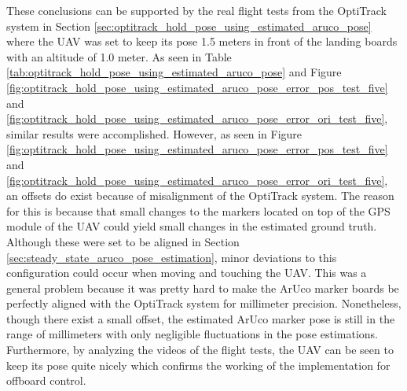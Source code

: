 \documentclass[../Head/report.tex]{subfiles}
\begin{document}
These conclusions can be supported by the real flight tests from the OptiTrack system in Section \ref{sec:optitrack_hold_pose_using_estimated_aruco_pose} where the UAV was set to keep its pose 1.5 meters in front of the landing boards with an altitude of 1.0 meter. As seen in Table \ref{tab:optitrack_hold_pose_using_estimated_aruco_pose} and Figure \ref{fig:optitrack_hold_pose_using_estimated_aruco_pose_error_pos_test_five} and \ref{fig:optitrack_hold_pose_using_estimated_aruco_pose_error_ori_test_five},  similar results were accomplished. However, as seen in Figure \ref{fig:optitrack_hold_pose_using_estimated_aruco_pose_error_pos_test_five} and \ref{fig:optitrack_hold_pose_using_estimated_aruco_pose_error_ori_test_five}, an offsets do exist because of misalignment of the OptiTrack system. The reason for this is because that small changes to the markers located on top of the GPS module of the UAV could yield small changes in the estimated ground truth. Although these were set to be aligned in Section \ref{sec:steady_state_aruco_pose_estimation}, minor deviations to this configuration could occur when moving and touching the UAV. This was a general problem because it was pretty hard to make the ArUco marker boards be perfectly aligned with the OptiTrack system for millimeter precision. Nonetheless, though there exist a small offset, the estimated ArUco marker pose is still in the range of millimeters with only negligible fluctuations in the pose estimations. Furthermore, by analyzing the videos of the flight tests, the UAV can be seen to keep its pose quite nicely which confirms the working of the implementation for offboard control. 
\end{document}
